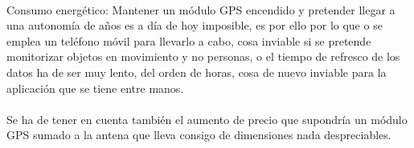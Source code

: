 \documentclass[a4paper ,12pt, onecolumn]{article}
\begin{document}
            \paragraph{}
            Consumo energético: Mantener un módulo GPS encendido y pretender llegar a una autonomía de años es a día de hoy
            imposible, es por ello por lo que o se emplea un teléfono móvil para llevarlo a cabo, cosa inviable si se pretende 
            monitorizar objetos en movimiento y no personas, o el tiempo de refresco de los datos ha de ser muy lento, del orden de horas,
            cosa de nuevo inviable para la aplicación que se tiene entre manos.
            \paragraph{}
            Se ha de tener en cuenta también el aumento de precio que supondría un módulo GPS sumado a la antena que lleva consigo de 
            dimensiones nada despreciables.
\end{document}
